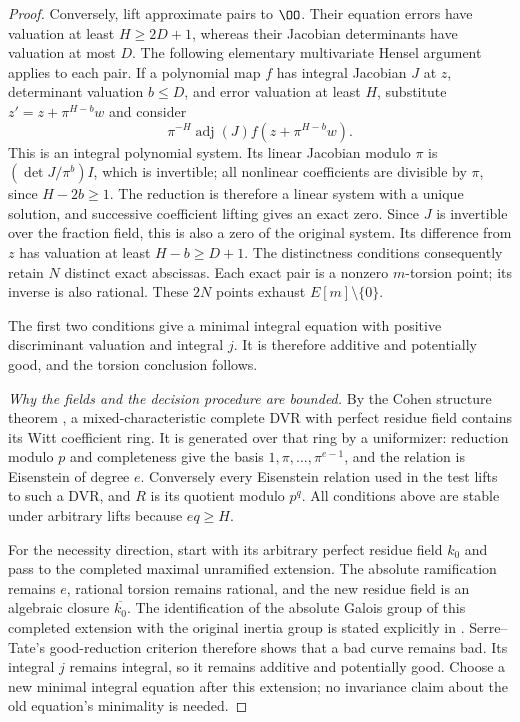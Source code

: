 \begin{proof}
Conversely, lift approximate pairs to $\OO$.  Their equation errors have valuation at least $H\geq2D+1$, whereas their Jacobian determinants have valuation at most $D$.  The following elementary multivariate Hensel argument applies to each pair.  If a polynomial map $f$ has integral Jacobian $J$ at $z$, determinant valuation $b\leq D$, and error valuation at least $H$, substitute $z'=z+\pi^{H-b}w$ and consider
\[
                \pi^{-H}\operatorname{adj}(J)
                              f(z+\pi^{H-b}w).
\]
This is an integral polynomial system.  Its linear Jacobian modulo $\pi$ is $(\det J/\pi^b)I$, which is invertible; all nonlinear coefficients are divisible by $\pi$, since $H-2b\geq1$.  The reduction is therefore a linear system with a unique solution, and successive coefficient lifting gives an exact zero.  Since $J$ is invertible over the fraction field, this is also a zero of the original system.  Its difference from $z$ has valuation at least $H-b\geq D+1$.  The distinctness conditions consequently retain $N$ distinct exact abscissas.  Each exact pair is a nonzero $m$-torsion point; its inverse is also rational.  These $2N$ points exhaust $E[m]\setminus\{0\}$.

The first two conditions give a minimal integral equation with positive discriminant valuation and integral $j$.  It is therefore additive and potentially good, and the torsion conclusion follows.

\emph{Why the fields and the decision procedure are bounded.}
By the Cohen structure theorem \cite[Theorem~10.160.8]{Stacks032A}, a mixed-characteristic complete DVR with perfect residue field contains its Witt coefficient ring.  It is generated over that ring by a uniformizer: reduction modulo $p$ and completeness give the basis $1,\pi,\ldots,\pi^{e-1}$, and the relation is Eisenstein of degree $e$.  Conversely every Eisenstein relation used in the test lifts to such a DVR, and $R$ is its quotient modulo $p^q$.  All conditions above are stable under arbitrary lifts because $eq\geq H$.

For the necessity direction, start with its arbitrary perfect residue field $k_0$ and pass to the completed maximal unramified extension.  The absolute ramification remains $e$, rational torsion remains rational, and the new residue field is an algebraic closure $\overline{k_0}$.  The identification of the absolute Galois group of this completed extension with the original inertia group is stated explicitly in \cite[section~5.1.5, pp.~156--157]{Fontaine1994Semi}.  Serre--Tate's good-reduction criterion \cite[Theorem~1, p.~493]{SerreTate1968Good} therefore shows that a bad curve remains bad.  Its integral $j$ remains integral, so it remains additive and potentially good.  Choose a new minimal integral equation after this extension; no invariance claim about the old equation's minimality is needed.


\end{proof}
